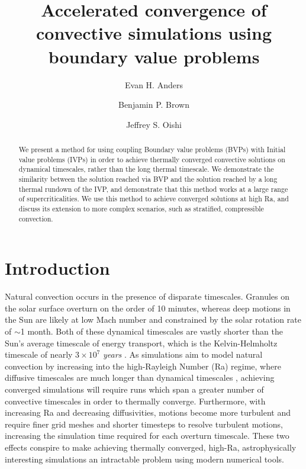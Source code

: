 \documentclass[aps, pre, onecolumn, nofootinbib, notitlepage, groupedaddress, amsfonts, amssymb, amsmath, longbibliography]{revtex4-1}
\begin{document}
\author{Evan H. Anders}
\author{Benjamin P. Brown}
\author{Jeffrey S. Oishi}
\title{Accelerated convergence of convective simulations using boundary value problems}

\begin{abstract}
We present a method for using coupling Boundary value problems (BVPs) with Initial value problems (IVPs)
in order to achieve thermally converged convective solutions on dynamical timescales, rather than the
long thermal timescale.  We demonstrate the similarity between the solution reached via BVP and the
solution reached by a long thermal rundown of the IVP, and demonstrate that this method works at a
large range of supercriticalities.  We use this method to achieve converged solutions at high Ra,
and discuss its extension to more complex scenarios, such as stratified, compressible convection.
\end{abstract}
\maketitle

\section{Introduction}
\label{sec:intro}
Natural convection occurs in the presence of disparate timescales. Granules on the
solar surface overturn on the order of 10 minutes, whereas deep motions in the Sun are likely at
low Mach number and constrained by the solar rotation rate of $\sim$1 month.  
Both of these dynamical timescales are vastly shorter than the Sun's average timescale of energy transport,
which is the Kelvin-Helmholtz timescale of nearly $3 \times 10^7$ \emph{years} \cite{stix2003}. 
As simulations aim to model natural convection
by increasing into the high-Rayleigh Number (Ra) regime, where diffusive timescales are much
longer than dynamical timescales \cite{Anders&Brown2017}, achieving converged simulations will 
require runs which span a greater number of convective timescales in order to thermally converge.
Furthermore, with increasing Ra and decreasing diffusivities, motions become more turbulent
and require finer grid meshes and shorter timesteps to resolve turbulent motions, increasing the simulation
time required for each overturn timescale.  
These two effects conspire to make achieving thermally converged, high-Ra, astrophysically interesting
simulations an intractable problem using modern numerical tools.
\end{document}
